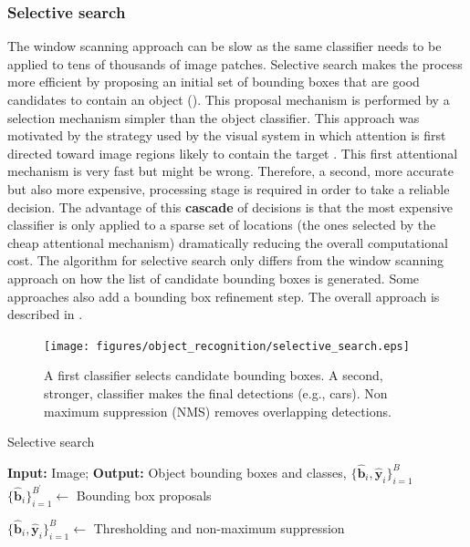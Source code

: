\subsubsection{Selective search}
The window scanning approach can be slow as the same classifier needs to be applied to tens of thousands of image patches. Selective search makes the process more efficient by proposing an initial set of bounding boxes that are good candidates to contain an object (\fig{\ref{fig:selective_search_pipeline}}). This proposal mechanism is performed by a selection mechanism simpler than the object classifier. 
This approach was motivated by the strategy used by the visual system in which attention is first directed toward image regions likely to contain the target \cite{wolfe2007,TreismanGelade1980,Koch_Ullman_1985}. This first attentional mechanism is very fast but might be wrong. Therefore, a second, more accurate but also more expensive, processing stage is required in order to take a reliable decision.  The advantage of this {\bf cascade} of decisions is that the most expensive classifier is only applied to a sparse set of locations (the ones selected by the cheap attentional mechanism) dramatically reducing the overall computational cost. The algorithm for selective search only differs from the window scanning approach on how the list of candidate bounding boxes is generated. Some approaches also add a bounding box refinement step.
The overall approach is described in \algref{\ref{alg:selective_search}}.

\begin{figure}[t]
\centerline{
\texttt{[image: figures/object\_recognition/selective\_search.eps]}
}
\caption{A first classifier selects candidate bounding boxes. A second, stronger, classifier makes the final detections (e.g., cars). Non maximum suppression (NMS) removes overlapping detections.}
\label{fig:selective_search_pipeline}
\end{figure}


\begin{algorithm}[h]
\SetAlgoVlined
\DontPrintSemicolon
{}
\caption{Selective search}
\faketablecaption{}
\label{alg:selective_search}
{\bf Input:} Image;
{\bf Output:} Object bounding boxes and classes, $\{\hat{\mathbf{b}}_i, \hat{\mathbf{y}}_i\}_{i=1}^B$\;
$\{\hat{\mathbf{b}}_i\}_{i=1}^{B^{\prime}} \leftarrow$ Bounding box proposals\;

$\{\hat{\mathbf{b}}_i, \hat{\mathbf{y}}_i\}_{i=1}^B \leftarrow$ Thresholding and non-maximum suppression\;
\end{algorithm}

